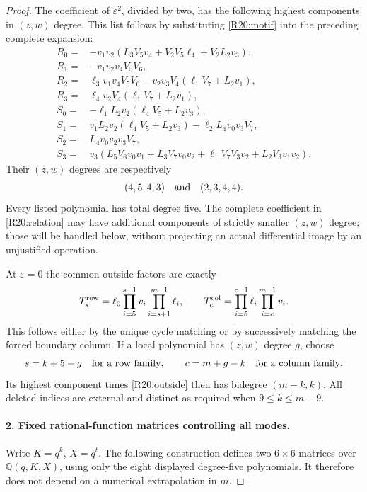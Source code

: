 \begin{proof}
The coefficient of $\varepsilon^2$, divided by two, has the following
highest components in $(z,w)$ degree. This list follows by substituting
\eqref{R20:motif} into the preceding complete expansion:
\begin{align*}
 R_0={}&-v_1v_2(L_3V_5v_4+V_2V_5\ell_4+V_2L_2v_3),\\
 R_1={}&-v_1v_2v_4V_5V_6,\\
 R_2={}&\ell_3v_1v_4V_5V_6
          -v_2v_3V_4(\ell_1V_7+L_2v_1),\\
 R_3={}&\ell_4v_2V_4(\ell_1V_7+L_2v_1),\\[2pt]
 S_0={}&-\ell_1L_2v_2(\ell_4V_5+L_2v_3),\\
 S_1={}&v_1L_2v_2(\ell_4V_5+L_2v_3)
          -\ell_2L_4v_0v_3V_7,\\
 S_2={}&L_4v_0v_2v_3V_7,\\
 S_3={}&v_3(L_5V_6v_0v_1+L_3V_7v_0v_2
                +\ell_1V_7V_3v_2+L_2V_3v_1v_2).
\end{align*}
Their $(z,w)$ degrees are respectively
\begin{equation}\label{R20:grades}
 (4,5,4,3)\quad\hbox{and}\quad(2,3,4,4).
\end{equation}
Every listed polynomial has total degree five. The complete
coefficient in \eqref{R20:relation} may have additional components
of strictly smaller $(z,w)$ degree; those will be handled below,
without projecting an actual differential image by an unjustified
operation.

At $\varepsilon=0$ the common outside factors are exactly
\begin{equation}\label{R20:outside}
 T_s^{\rm row}=\ell_0\prod_{i=5}^{s-1}v_i
                         \prod_{i=s+1}^{m-1}\ell_i,
 \qquad
 T_c^{\rm col}=\prod_{i=5}^{c-1}\ell_i
                         \prod_{i=c}^{m-1}v_i.
\end{equation}
This follows either by the unique cycle matching or by successively
matching the forced boundary column. If a local polynomial has
$(z,w)$ degree $g$, choose
\begin{equation}\label{R20:alignment}
 s=k+5-g\quad\hbox{for a row family},\qquad
 c=m+g-k\quad\hbox{for a column family}.
\end{equation}
Its highest component times \eqref{R20:outside} then has bidegree
$(m-k,k)$. All deleted indices are external and distinct as required
when $9\leq k\leq m-9$.

\paragraph{2. Fixed rational-function matrices controlling all modes.}
Write $K=q^k$, $X=q^t$. The following construction defines two
$6\times6$ matrices over $\mathbb Q(q,K,X)$, using only the eight
displayed degree-five polynomials. It therefore does not depend on
a numerical extrapolation in $m$.


\end{proof}
